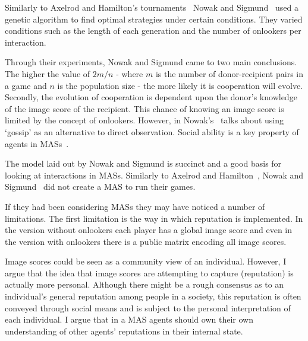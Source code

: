 \documentclass[]{final_report}
\begin{document}
Similarly to Axelrod and Hamilton's tournaments~\cite{evolution_of_cooperation} Nowak and Sigmund~\cite{evol_indirect_image} used a genetic algorithm to find optimal strategies under certain conditions. They varied conditions such as the length of each generation and the number of onlookers per interaction.\par 
Through their experiments, Nowak and Sigmund came to two main conclusions. The higher the value of $2m/n$ - where $m$ is the number of donor-recipient pairs in a game and $n$ is the population size - the more likely it is cooperation will evolve. Secondly, the evolution of cooperation is dependent upon the donor's knowledge of the image score of the recipient. This chance of knowing an image score is limited by the concept of onlookers. However, in Nowak's~\cite{five_rules_coop} talks about using `gossip' as an alternative to direct observation. Social ability is a key property of agents in MASs~\cite{wooldridge_jennings_1995}.\par 
The model laid out by Nowak and Sigmund is succinct and a good basis for looking at interactions in MASs. Similarly to Axelrod and Hamilton~\cite{evolution_of_cooperation}, Nowak and Sigmund~\cite{evol_indirect_image} did not create a MAS to run their games.\par
If they had been considering MASs they may have noticed a number of limitations. The first limitation is the way in which reputation is implemented. In the version without onlookers each player has a global image score and even in the version with onlookers there is a public matrix encoding all image scores.\par
Image scores could be seen as a community view of an individual. However, I argue that the idea that image scores are attempting to capture (reputation) is actually more personal. Although there might be a rough consensus as to an individual's general reputation among people in a society, this reputation is often conveyed through social means and is subject to the personal interpretation of each individual. I argue that in a MAS agents should own their own understanding of other agents' reputations in their internal state.
\end{document}
